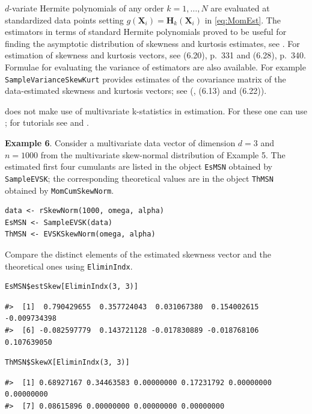 \(d\)-variate Hermite polynomials of any order \(k=1, \dots, N\) are evaluated at standardized data points setting \(g(\mathbf{X}_i)=\mathbf{H}_k(\mathbf{X}_i)\) in \eqref{eq:MomEst}. The estimators in terms of standard Hermite polynomials proved to be useful for finding the asymptotic distribution of skewness and kurtosis estimates, see \citet{jamma2021SJS}. For estimation of skewness and kurtosis vectors, see \citet{terdik2021multivariate} (6.20), p.~331 and (6.28), p.~340. Formulae for evaluating the variance of estimators are also available. For example \texttt{SampleVarianceSkewKurt} provides estimates of the covariance matrix of the data-estimated skewness and kurtosis vectors; see (\citet{terdik2021multivariate}, (6.13) and (6.22)).

 does not make use of multivariate k-statistics in estimation. For these one can use ; for tutorials see \citet{dinardo22b} and \citet{smith2020tutorial}.

\textbf{Example 6}. Consider a multivariate data vector of dimension \(d=3\) and \(n=1000\) from the multivariate skew-normal distribution of Example 5. The estimated first four cumulants are listed in the object \texttt{EsMSN} obtained by \texttt{SampleEVSK}; the corresponding theoretical values are in the object \texttt{ThMSN} obtained by \texttt{MomCumSkewNorm}.

\begin{verbatim}
data <- rSkewNorm(1000, omega, alpha)
EsMSN <- SampleEVSK(data)
ThMSN <- EVSKSkewNorm(omega, alpha)
\end{verbatim}

Compare the distinct elements of the estimated skewness vector and the theoretical ones using \texttt{EliminIndx}.

\begin{verbatim}
EsMSN$estSkew[EliminIndx(3, 3)]
\end{verbatim}

\begin{verbatim}
#>  [1]  0.790429655  0.357724043  0.031067380  0.154002615 -0.009734398
#>  [6] -0.082597779  0.143721128 -0.017830889 -0.018768106  0.107639050
\end{verbatim}

\begin{verbatim}
ThMSN$SkewX[EliminIndx(3, 3)]
\end{verbatim}

\begin{verbatim}
#>  [1] 0.68927167 0.34463583 0.00000000 0.17231792 0.00000000 0.00000000
#>  [7] 0.08615896 0.00000000 0.00000000 0.00000000
\end{verbatim}

